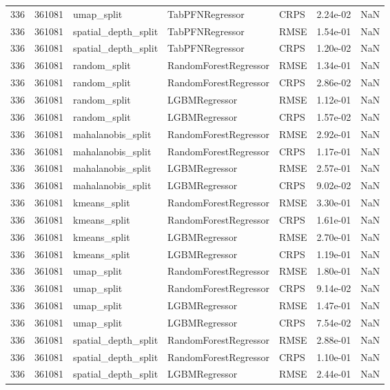 \begin{tabular}{rrlllrr}
336 & 361081 & umap\_split & TabPFNRegressor & CRPS & 2.24e-02 & NaN \\
336 & 361081 & spatial\_depth\_split & TabPFNRegressor & RMSE & 1.54e-01 & NaN \\
336 & 361081 & spatial\_depth\_split & TabPFNRegressor & CRPS & 1.20e-02 & NaN \\
336 & 361081 & random\_split & RandomForestRegressor & RMSE & 1.34e-01 & NaN \\
336 & 361081 & random\_split & RandomForestRegressor & CRPS & 2.86e-02 & NaN \\
336 & 361081 & random\_split & LGBMRegressor & RMSE & 1.12e-01 & NaN \\
336 & 361081 & random\_split & LGBMRegressor & CRPS & 1.57e-02 & NaN \\
336 & 361081 & mahalanobis\_split & RandomForestRegressor & RMSE & 2.92e-01 & NaN \\
336 & 361081 & mahalanobis\_split & RandomForestRegressor & CRPS & 1.17e-01 & NaN \\
336 & 361081 & mahalanobis\_split & LGBMRegressor & RMSE & 2.57e-01 & NaN \\
336 & 361081 & mahalanobis\_split & LGBMRegressor & CRPS & 9.02e-02 & NaN \\
336 & 361081 & kmeans\_split & RandomForestRegressor & RMSE & 3.30e-01 & NaN \\
336 & 361081 & kmeans\_split & RandomForestRegressor & CRPS & 1.61e-01 & NaN \\
336 & 361081 & kmeans\_split & LGBMRegressor & RMSE & 2.70e-01 & NaN \\
336 & 361081 & kmeans\_split & LGBMRegressor & CRPS & 1.19e-01 & NaN \\
336 & 361081 & umap\_split & RandomForestRegressor & RMSE & 1.80e-01 & NaN \\
336 & 361081 & umap\_split & RandomForestRegressor & CRPS & 9.14e-02 & NaN \\
336 & 361081 & umap\_split & LGBMRegressor & RMSE & 1.47e-01 & NaN \\
336 & 361081 & umap\_split & LGBMRegressor & CRPS & 7.54e-02 & NaN \\
336 & 361081 & spatial\_depth\_split & RandomForestRegressor & RMSE & 2.88e-01 & NaN \\
336 & 361081 & spatial\_depth\_split & RandomForestRegressor & CRPS & 1.10e-01 & NaN \\
336 & 361081 & spatial\_depth\_split & LGBMRegressor & RMSE & 2.44e-01 & NaN \\

\end{tabular}
